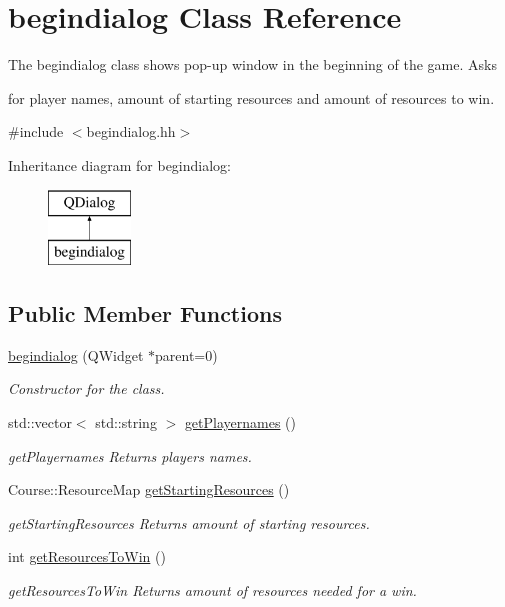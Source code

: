 \hypertarget{classbegindialog}{\section{begindialog Class Reference}
\label{classbegindialog}
}


The begindialog class shows pop-\/up window in the beginning of the game. Asks \par
for player names, amount of starting resources and amount of resources to win.  




{\ttfamily \#include $<$begindialog.\-hh$>$}

Inheritance diagram for begindialog\-:\begin{figure}[H]
\begin{center}
\leavevmode
\includegraphics[height=2.000000cm]{classbegindialog}
\end{center}
\end{figure}
\subsection*{Public Member Functions}
\begin{DoxyCompactItemize}
\item 
\hyperlink{classbegindialog_a76bb9418e0b00fbb94c2cef459a83b08}{begindialog} (Q\-Widget $\ast$parent=0)
\begin{DoxyCompactList}\small\item\em Constructor for the class. \end{DoxyCompactList}\item 
std\-::vector$<$ std\-::string $>$ \hyperlink{classbegindialog_a3614bf1959c37603e094d39640190123}{get\-Playernames} ()
\begin{DoxyCompactList}\small\item\em get\-Playernames Returns players names. \end{DoxyCompactList}\item 
Course\-::\-Resource\-Map \hyperlink{classbegindialog_a1fdc4bd90ddc27df8064bea149b14fbf}{get\-Starting\-Resources} ()
\begin{DoxyCompactList}\small\item\em get\-Starting\-Resources Returns amount of starting resources. \end{DoxyCompactList}\item 
int \hyperlink{classbegindialog_a0a0d98c8c33dc11b35293a9d6104e2d6}{get\-Resources\-To\-Win} ()
\begin{DoxyCompactList}\small\item\em get\-Resources\-To\-Win Returns amount of resources needed for a win. \end{DoxyCompactList}\end{DoxyCompactItemize}


